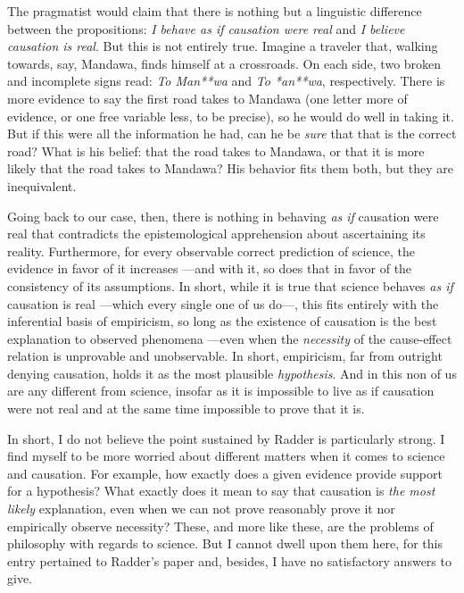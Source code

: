\documentclass[a4paper]{article}
\begin{document}
The pragmatist would claim that there is nothing but a linguistic difference
between the propositions: \textit{I behave as if causation were real} and
\textit{I believe causation is real}. But this is not entirely true. Imagine a
traveler that, walking towards, say, Mandawa, finds himself at a crossroads. On
each side, two broken and incomplete signs read: \textit{To Man**wa} and
\textit{To *an**wa}, respectively. There is more evidence to say the first road
takes to Mandawa (one letter more of evidence, or one free variable less, to be
precise), so he would do well in taking it. But if this were all the information
he had, can he be \textit{sure} that that is the correct road? What is his
belief: that the road takes to Mandawa, or that it is more likely that the road
takes to Mandawa? His behavior fits them both, but they are inequivalent.

Going back to our case, then, there is nothing in behaving \textit{as if}
causation were real that contradicts the epistemological apprehension about
ascertaining its reality. Furthermore, for every observable correct prediction
of science, the evidence in favor of it increases ---and with it, so does that
in favor of the consistency of its assumptions. In short, while it is true that
science behaves \textit{as if} causation is real ---which every single one of us
do---, this fits entirely with the inferential basis of empiricism, so long as
the existence of causation is the best explanation to observed phenomena ---even
when the \textit{necessity} of the cause-effect relation is unprovable and
unobservable. In short, empiricism, far from outright denying causation, holds
it as the most plausible \textit{hypothesis}. And in this non of us are any
different from science, insofar as it is impossible to live as if causation were
not real and at the same time impossible to prove that it is.

In short, I do not believe the point sustained by Radder is particularly strong.
I find myself to be more worried about different matters when it comes to
science and causation. For example, how exactly does a given evidence provide
support for a hypothesis? What exactly does it mean to say that causation is
\textit{the most likely} explanation, even when we can not prove reasonably
prove it nor empirically observe necessity? These, and
more like these, are the problems of philosophy with regards to science. But I
cannot dwell upon them here, for this entry pertained to Radder's paper and,
besides, I have no satisfactory answers to give.
\end{document}
